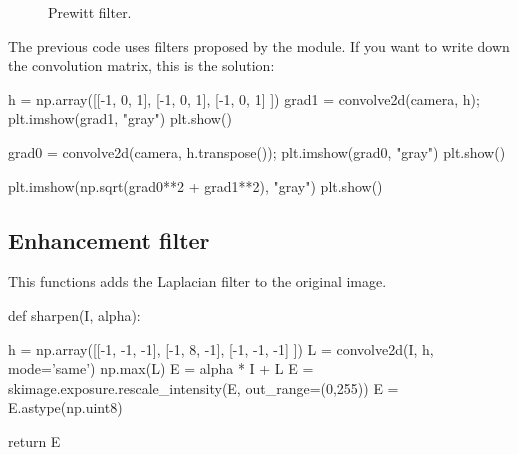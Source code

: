 \begin{figure}[H]
\centering\caption{Prewitt filter.}
\hspace{1.5cm}
\label{fig:introduction:python:prewitt}
\end{figure}

The previous code uses filters proposed by the  module. If you want to write down the convolution matrix, this is the solution:
\begin{python}
h = np.array([[-1, 0, 1], [-1, 0, 1], [-1, 0, 1] ])
grad1 = convolve2d(camera, h);
plt.imshow(grad1, "gray")
plt.show()

grad0 = convolve2d(camera, h.transpose());
plt.imshow(grad0, "gray")
plt.show()

plt.imshow(np.sqrt(grad0**2 + grad1**2), "gray")
plt.show()
\end{python}


\subsection{Enhancement filter}

This functions adds the Laplacian filter to the original image.
\begin{python}
def sharpen(I, alpha):
    
    h = np.array([[-1, -1, -1], [-1, 8, -1], [-1, -1, -1] ])
    L = convolve2d(I, h, mode='same')
    np.max(L)
    E = alpha * I + L
    E = skimage.exposure.rescale_intensity(E, out_range=(0,255))
    E = E.astype(np.uint8)
    
    return E
\end{python}

